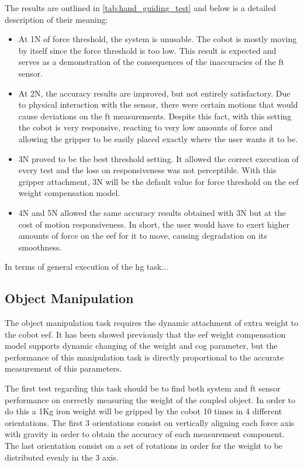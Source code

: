 \par The results are outlined in \autoref{tab:hand_guiding_test} and below is a detailed description of their meaning:
\begin{itemize}
    \item At 1N of force threshold, the system is unusable. The cobot is mostly moving by itself since the force threshold is too low. This result is expected and serves as a demonstration of the consequences of the inaccuracies of the \ac{ft} sensor.
    \item At 2N, the accuracy results are improved, but not entirely satisfactory. Due to physical interaction with the sensor, there were certain motions that would cause deviations on the \ac{ft} measurements. Despite this fact, with this setting the cobot is very responsive, reacting to very low amounts of force and allowing the gripper to be easily placed exactly where the user wants it to be.
    \item 3N proved to be the best threshold setting. It allowed the correct execution of every test and the loss on responsiveness was not perceptible. With this gripper attachment, 3N will be the default value for force threshold on the \ac{eef} weight compensation model.
    \item 4N and 5N allowed the same accuracy results obtained with 3N but at the cost of motion responsiveness. In short, the user would have to exert higher amounts of force on the \ac{eef} for it to move, causing degradation on its smoothness.
\end{itemize}

\par In terms of general execution of the \ac{hg} task...

\subsection{Object Manipulation}

\par The object manipulation task requires the dynamic attachment of extra weight to the cobot \ac{eef}. It has been showed previously that the \ac{eef} weight compensation model supports dynamic changing of the weight and \ac{cog} parameter, but the performance of this manipulation task is directly proportional to the accurate measurement of this parameters.
\par The first test regarding this task should be to find both system and \ac{ft} sensor performance on correctly measuring the weight of the coupled object. In order to do this a 1Kg iron weight will be gripped by the cobot 10 times in 4 different orientations. The first 3 orientations consist on vertically aligning each force axis with gravity in order to obtain the accuracy of each measurement component. The last orientation consist on a set of rotations in order for the weight to be distributed evenly in the 3 axis.

